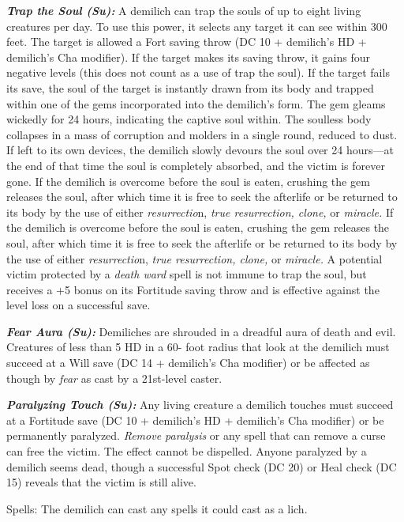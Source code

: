 \documentclass{article}
\begin{document}
\textit{\textbf{Trap the Soul (Su):}}\textit{ }A demilich can trap the souls of 
up to eight living creatures per day. To use this power, it selects any target 
it can see within 300 feet. The target is allowed a Fort saving throw (DC 10 + 
demilich's HD + demilich's Cha modifier). If the target makes its saving throw, 
it gains four negative levels (this does not count as a use of trap the soul). 
If the target fails its save, the soul of the target is instantly drawn from its 
body and trapped within one of the gems incorporated into the demilich's form. 
The gem gleams wickedly for 24 hours, indicating the captive soul within. The soulless 
body collapses in a mass of corruption and molders in a single round, reduced to 
dust. If left to its own devices, the demilich slowly devours the soul over 24 
hours---at the end of that time the soul is completely absorbed, and the victim 
is forever gone. If the demilich is overcome before the soul is eaten, crushing 
the gem releases the soul, after which time it is free to seek the afterlife or 
be returned to its body by the use of either \textit{resurrectio}n, \textit{true 
resurrection, clone, }or \textit{miracle. }If the demilich is overcome before the 
soul is eaten, crushing the gem releases the soul, after which time it is free 
to seek the afterlife or be returned to its body by the use of either \textit{resurrectio}n, 
\textit{true resurrection, clone, }or \textit{miracle. }A potential victim protected 
by a \textit{death ward }spell is not immune to trap the soul, but receives a +5 
bonus on its Fortitude saving throw and\textit{ }is effective against the level 
loss on a successful save. 

\textit{\textbf{Fear Aura (Su): }}Demiliches are shrouded in a dreadful aura of 
death and evil. Creatures of less than 5 HD in a 60- foot radius that look at the 
demilich must succeed at a Will save (DC 14 + demilich's Cha modifier) or be affected 
as though by \textit{fear }as cast by a 21st-level caster. 

\textit{\textbf{Paralyzing Touch (Su): }}Any living creature a demilich touches 
must succeed at a Fortitude save (DC 10 + demilich's HD + demilich's Cha modifier) 
or be permanently paralyzed. \textit{Remove paralysis }or any spell that can remove 
a curse can free the victim. The effect cannot be dispelled. Anyone paralyzed by 
a demilich seems dead, though a successful Spot check (DC 20) or Heal check (DC 
15) reveals that the victim is still alive. 

Spells: The demilich can cast any spells it could cast as a lich. 
\end{document}
